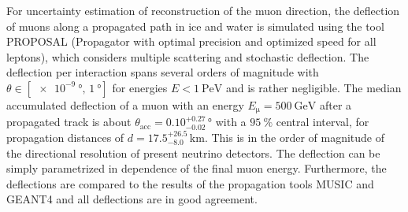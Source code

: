 For uncertainty estimation of reconstruction of the muon direction, the 
deflection of muons along a propagated path in ice and water is simulated using 
the tool PROPOSAL (Propagator with optimal precision and optimized speed for all leptons), which considers multiple scattering and stochastic deflection. 
The deflection per interaction spans several 
orders of magnitude with $\theta \in [\SI{e-9}{\degree},\, \SI{1}{\degree}]$ 
for energies $E < \SI{1}{\peta\electronvolt}$ 
and is rather negligible. The median accumulated 
deflection of a muon with an energy $E_{\mathrm{\mu}} = \SI{500}{\giga\electronvolt}$ 
after a propagated track is about $\theta_{\text{acc}} = 0.10_{-0.02}^{+0.27}\,\si{\degree}$ 
with a $\SI{95}{\percent}$ central interval, 
for propagation distances of $d = 17.5_{-8.0}^{+26.5}\,\si{\kilo\meter}$. 
This is in the order of magnitude of 
the directional resolution of 
present neutrino detectors. The deflection can be simply parametrized in 
dependence of the final muon energy. Furthermore, the deflections are compared to the results 
of the propagation tools MUSIC and GEANT4 and all deflections are in good 
agreement. 
